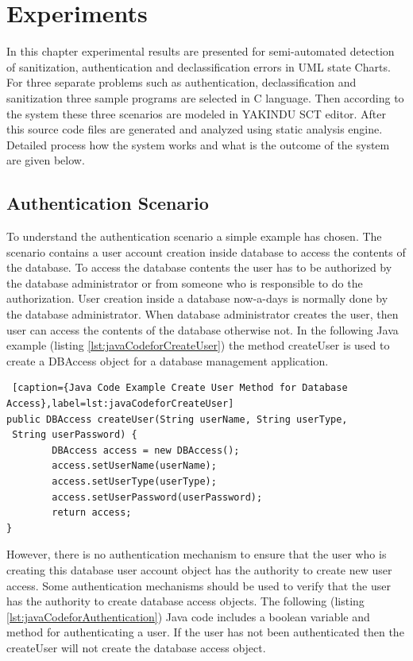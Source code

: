 \chapter{Experiments}
In this chapter experimental results are presented for semi-automated detection of sanitization, authentication and declassification errors in UML state Charts. For three separate problems such as authentication, declassification and sanitization three sample programs are selected in C language. Then according to the system these three scenarios are modeled in YAKINDU SCT editor. After this source code files are generated and analyzed using static analysis engine. Detailed process how the system works and what is the outcome of the system are given below.

\section{Authentication Scenario}

To understand the authentication scenario a simple example has chosen. The scenario contains a user account creation inside database to access the contents of the database. To access the database contents the user has to be authorized by the database administrator or from someone who is responsible to do the authorization. User creation inside a database now-a-days is normally done by the database administrator. When database administrator creates the user, then user can access the contents of the database otherwise not. In the following Java example (listing \ref{lst:javaCodeforCreateUser}) the method createUser is used to create a DBAccess object for a database management application.

\begin{lstlisting} [caption={Java Code Example Create User Method for Database Access},label=lst:javaCodeforCreateUser]
public DBAccess createUser(String userName, String userType,
 String userPassword) {
		DBAccess access = new DBAccess();
		access.setUserName(userName);
		access.setUserType(userType);
		access.setUserPassword(userPassword);				
		return access;
}

\end{lstlisting}

However, there is no authentication mechanism to ensure that the user who is creating this database user account object has the authority to create new user access. Some authentication mechanisms should be used to verify that the user has the authority to create database access objects.
The following (listing \ref{lst:javaCodeforAuthentication}) Java code includes a boolean variable and method for authenticating a user. If the user has not been authenticated then the createUser will not create the database access object.

